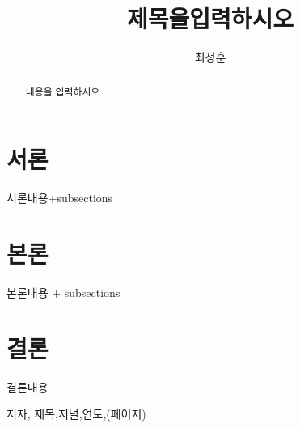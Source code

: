 \documentclass[11pt,a4paper]{article} %
\begin{document}
\title{제목을입력하시오}
\author{최정훈}
\maketitle
\begin{abstract}
내용을 입력하시오
\end{abstract}
\newpage

\tableofcontents
\newpage

\section{서론}
서론내용+subsections
\newpage

\section{본론}
본론내용 + subsections
\newpage

\section{결론}
결론내용
\newpage

\begin{thebibliography}{99} %
 저자, 제목,저널,연도,(페이지)  %

\end{thebibliography}
\end{document}
